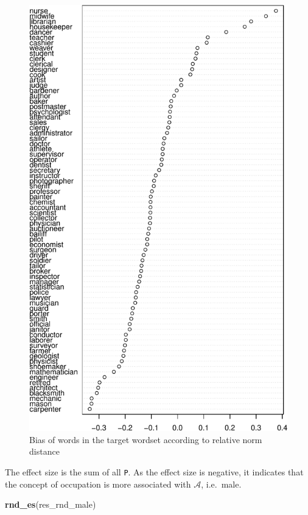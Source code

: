 \documentclass[english,man,mask]{apa6}
\newenvironment{Shaded}{\begin{snugshade}}{\end{snugshade}}
\newcommand{\KeywordTok}[1]{\textcolor[rgb]{0.13,0.29,0.53}{\textbf{#1}}}
\newcommand{\NormalTok}[1]{#1}
\begin{document}
\begin{figure}
\centering
\includegraphics{ica_files/figure-latex/rnd-1.pdf}
\caption{\label{fig:rnd}Bias of words in the target wordset according to relative norm distance}
\end{figure}

The effect size is the sum of all \texttt{P}. As the effect size is negative, it indicates that the concept of occupation is more associated with \(\mathcal{A}\), i.e.~male.

\begin{Shaded}
\begin{Highlighting}[]
\KeywordTok{rnd_es}\NormalTok{(res_rnd_male)}
\end{Highlighting}
\end{Shaded}
\end{document}
